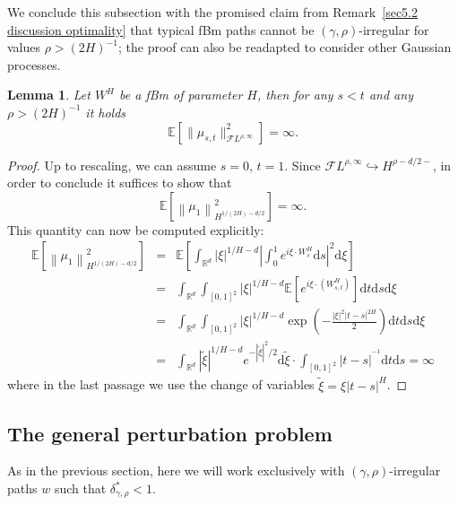 \documentclass[10pt]{article}
\newcommand{\mathd}{\mathrm{d}}
\newtheorem{lemma}[theorem]{Lemma}
\begin{document}
We conclude this subsection with the promised claim from Remark~\ref{sec5.2
discussion optimality} that typical fBm paths cannot be $(\gamma,
\rho)$-irregular for values $\rho > (2 H)^{- 1}$; the proof can also be
readapted to consider other Gaussian processes.

\begin{lemma}
  \label{lem:negative-answer-fbm}Let $W^H$ be a fBm of parameter $H$, then for
  any $s < t$ and any $\rho > (2 H)^{- 1}$ it holds
  \[ \mathbb{E} [\| \mu_{s, t} \|_{\mathcal{F} L^{\rho, \infty}}^2] = \infty
     . \]
\end{lemma}

\begin{proof}
  Up to rescaling, we can assume $s = 0$, $t = 1$. Since $\mathcal{F} L^{\rho,
  \infty} \hookrightarrow H^{\rho - d / 2 -}$, in order to conclude it
  suffices to show that
  \[ \mathbb{E} \left[ \left\| \mu_1 \right\|^2_{H^{1 / (2 H) - d / 2}}
     \right] = \infty . \]
  This quantity can now be computed explicitly:
  \begin{eqnarray*}
    \mathbb{E} \left[ \left\| \mu_1 \right\|^2_{H^{1 / (2 H) - d / 2}} 
    \right] & = & \mathbb{E} \left[ \int_{\mathbb{R}^d} | \xi |^{1 / H - d}
    \left| \int_0^1 e^{i \xi \cdot W^H_s} \mathd s \right|^2 \mathd \xi
    \right]\\
    & = & \int_{\mathbb{R}^d} \int_{[0, 1]^2} | \xi |^{1 / H - d} \mathbb{E}
    [e^{i \xi \cdot (W^H_{s, t})}] \mathd t \mathd s \mathd \xi\\
    & = & \int_{\mathbb{R}^d} \int_{[0, 1]^2} | \xi |^{1 / H - d} \exp \left(
    - \frac{| \xi |^2 | t - s |^{2 H}}{2} \right) \mathd t \mathd s \mathd
    \xi\\
    & = & \int_{\mathbb{R}^d} | \tilde{\xi} |^{1 / H - d} e^{- | \tilde{\xi}
    |^2 / 2} \mathd \tilde{\xi} \cdot \int_{[0, 1]^2} | t - s |^{^{- 1}}
    \mathd t \mathd s = \infty
  \end{eqnarray*}
  where in the last passage we use the change of variables $\tilde{\xi} = \xi
  | t - s |^H$.
\end{proof}

\subsection{The general perturbation problem}\label{sec5.3}

As in the previous section, here we will work exclusively with $(\gamma,\rho)$-irregular paths $w$ such that $\delta^\ast_{\gamma,\rho}<1$. 
\end{document}
